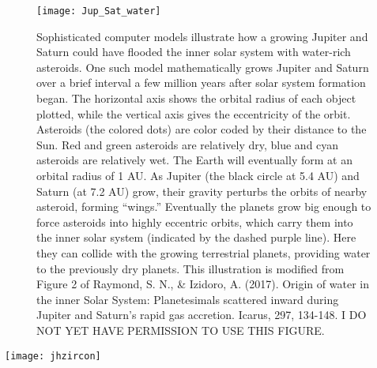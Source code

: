 \documentclass[amstex,12pt]{book}
\begin{document}
{\newpage
\begin{figure}[p]
\centering
\texttt{[image: Jup\_Sat\_water]}%
\caption{Sophisticated computer models illustrate how a growing Jupiter and Saturn could have flooded the inner solar system with water-rich asteroids. One such model mathematically grows Jupiter and Saturn over a brief interval a few million years after solar system formation began. The horizontal axis shows the orbital radius of each object plotted, while the vertical axis gives the eccentricity of the orbit. Asteroids (the colored dots) are color coded by their distance to the Sun. Red and green asteroids are relatively dry, blue and cyan asteroids are relatively wet. The Earth will eventually form at an orbital radius of 1 AU. As Jupiter (the black circle at 5.4 AU) and Saturn (at 7.2 AU) grow, their gravity perturbs the orbits of nearby asteroid, forming ``wings.'' Eventually the planets grow big enough to force asteroids into highly eccentric orbits, which carry them into the inner solar system (indicated by the dashed purple line). Here they can collide with the growing terrestrial planets, providing water to the previously dry planets. This illustration is modified from Figure 2 of Raymond, S. N., \& Izidoro, A. (2017). Origin of water in the inner Solar System: Planetesimals scattered inward during Jupiter and Saturn’s rapid gas accretion. Icarus, 297, 134-148. I DO NOT YET HAVE PERMISSION TO USE THIS FIGURE.}   
\label{fig:jupiter_source_water}
\end{figure}


\newpage
\begin{sidewaysfigure}[ht]
\centering
\texttt{[image: jhzircon]}%
\caption{The oldest bits of our planet known are found in an ancient part of western Australia (pane a). From space (b) the desolate Jack Hills region shows ~3 Ga sedimentary rocks that have repeatedly been heated an deformed. On the ground (c), the rocks include conglomerates clearly formed by and in running water, hardly surprising in such ``young'' rocks. Zircon grains (d) found in these rocks are substantially older than their host rocks: the lower left corner of the zircon here is \num[separate-uncertainty = true]{4.404(8)}. Oxygen isotope ratios in the zircon indicate that the rocks from which the zircon formed had interacted with liquid water. Earth's hydrosphere was up and running over 4.4 billion years ago. Pane (a) and (b) are courtesy of NASA Earth Observatory (https://earthobservatory.nasa.gov/Features/Zircon/Images/australia\_map.jpg; https://eoimages.gsfc.nasa.gov/images/imagerecords/6000/6331/jackhills\_etm\_1999208\_lrg.jpg). Panes (c; http://www.geology.wisc.edu/zircon/Earliest\%20Piece/Images/3.jpg) and (d; http://www.geology.wisc.edu/zircon/Earliest\%20Piece/Images/5.jpg) are from John Valley's web site, and I DO NOT YET HAVE PERMISSION TO USE THIS THEM. }   
\label{fig:jhzirc}
\end{sidewaysfigure}

}
\end{document}
